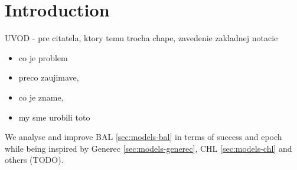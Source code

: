 







\section*{Introduction}
\label{sec:introduction} 


UVOD - pre citatela, ktory temu trocha chape, zavedenie zakladnej notacie 
\begin{itemize} 
\item   co je problem
\item   preco zaujimave,
\item   co je zname,
\item   my sme urobili toto
\end{itemize} 

We analyse and improve BAL \ref{sec:models-bal} in terms of success and epoch while being inspired by Generec \ref{sec:models-generec}, CHL \ref{sec:models-chl} and others (TODO). 

